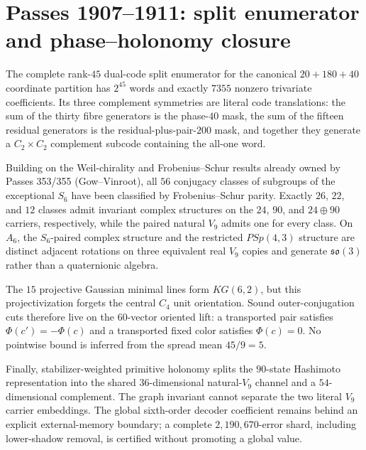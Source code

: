 \section*{Passes 1907--1911: split enumerator and phase--holonomy closure}
The complete rank-$45$ dual-code split enumerator for the canonical
$20+180+40$ coordinate partition has $2^{45}$ words and exactly $7355$
nonzero trivariate coefficients.  Its three complement symmetries are
literal code translations: the sum of the thirty fibre generators is the
phase-$40$ mask, the sum of the fifteen residual generators is the
residual-plus-pair-$200$ mask, and together they generate a
$C_2\times C_2$ complement subcode containing the all-one word.

Building on the Weil-chirality and Frobenius--Schur results already owned by
Passes 353/355 (Gow--Vinroot), all $56$ conjugacy classes of subgroups of the exceptional $S_6$ have been
classified by Frobenius--Schur parity.  Exactly $26$, $22$, and $12$ classes
admit invariant complex structures on the $24$, $90$, and $24\oplus90$
carriers, respectively, while the paired natural $V_9$ admits one for every
class.  On $A_6$, the $S_6$-paired complex structure and the restricted
$PSp(4,3)$ structure are distinct adjacent rotations on three equivalent
real $V_9$ copies and generate $\mathfrak{so}(3)$ rather than a quaternionic
algebra.

The $15$ projective Gaussian minimal lines form $KG(6,2)$, but this
projectivization forgets the central $C_4$ unit orientation.  Sound
outer-conjugation cuts therefore live on the $60$-vector oriented lift: a
transported pair satisfies $\Phi(c')=-\Phi(c)$ and a transported fixed color
satisfies $\Phi(c)=0$.  No pointwise bound is inferred from the spread mean
$45/9=5$.

Finally, stabilizer-weighted primitive holonomy splits the $90$-state
Hashimoto representation into the shared $36$-dimensional natural-$V_9$
channel and a $54$-dimensional complement.  The graph invariant cannot
separate the two literal $V_9$ carrier embeddings.  The global sixth-order
decoder coefficient remains behind an explicit external-memory boundary;
a complete $2{,}190{,}670$-error shard, including lower-shadow removal, is
certified without promoting a global value.
